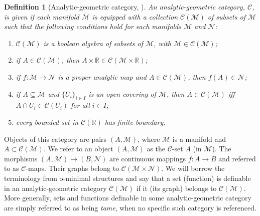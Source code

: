 \documentclass{article}
\newtheorem{definition}{Definition}
\newcommand{\CM}{\mathcal{M}}
\newcommand{\BR}{\mathbb{R}}
\begin{document}
\begin{definition}[Analytic-geometric category, \cite{Dries1996GeometricCA}]
An analytic-geometric category, $\mathcal{C}$, is given if each manifold $\CM$ is equipped with a collection $\mathcal{C}(\CM)$ of subsets of $\CM$ such that the following conditions hold for each manifolds $\CM$ and $\mathcal{N}$:
\begin{enumerate}\setlength\itemsep{0.5em}
	        \item[{1)}] $\mathcal{C}(\CM)$ is a boolean algebra of subsets of $\CM$, with $\CM\in\mathcal{C}(\CM)$;
	        \item[{2)}] if $A\in\mathcal{C}(\CM)$, then $A\times \BR\in \mathcal{C}(\CM\times \BR)$; 
	        \item[{3)}] if $f:\CM\to\mathcal{N}$ is a proper analytic map and $A\in\mathcal{C}(\CM)$, then $f(A)\in\mathcal{N}$;
	        \item[{4)}] if $A\subseteq\CM$ and $\{U_i\}_{i\in I}$ is an open covering of $\CM$, then $A\in\mathcal{C}(\CM)$ iff $A\cap U_i\in\mathcal{C}(U_i)$ for all $i\in I$;
                \item[{5)}] every bounded set in $\mathcal{C}(\BR)$ has finite boundary.
	    \end{enumerate}
\end{definition}
Objects of this category are pairs $(A,\CM)$, where $\CM$ is a manifold and $A\subset \mathcal{C}(\CM)$. We refer to an object $(A,\CM)$ as the $\mathcal{C}$-set $A$ (in $\CM$). The morphisms $(A,\CM)\to (B,\mathcal{N})$ are continuous mappings $f:A\to B$ and referred to as $\mathcal{C}$-maps. Their graphs belong to $\mathcal{C}(\CM\times \mathcal{N})$. We will borrow the terminology from o-minimal structures and say that a set (function) is definable in an analytic-geometric category $\mathcal{C}(\CM)$ if it (its graph) belongs to $\mathcal{C}(\CM)$. More generally, sets and functions definable in some analytic-geometric category are simply referred to as being \emph{tame}, when no specific such category is referenced.  
\end{document}
